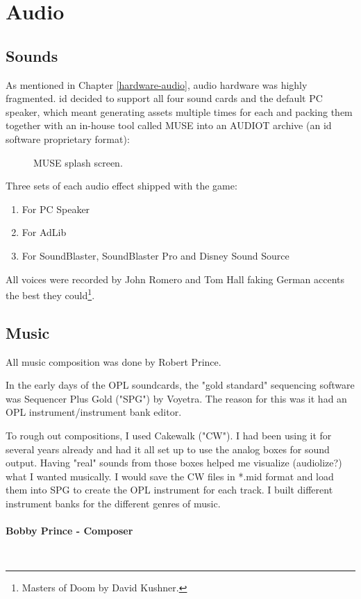 \documentclass[book.tex]{subfiles}
\begin{document}
\section{Audio}

\subsection{Sounds}
As mentioned in Chapter \ref{hardware-audio}, audio hardware was highly fragmented. id decided to support all four sound cards and the default PC speaker, which meant generating assets multiple times for each and packing them together with an in-house tool called MUSE into an AUDIOT archive (an id software proprietary format):\\
\begin{figure}[H]
\centering

  \caption{MUSE splash screen.}
 \end{figure}
 \par
 Three sets of each audio effect shipped with the game:
\begin{enumerate}
\item For PC Speaker
\item For AdLib
\item For SoundBlaster, SoundBlaster Pro and Disney Sound Source
\end{enumerate}

\par
All voices were recorded by John Romero and Tom Hall faking German accents the best they could\footnote{Masters of Doom by David Kushner.}.






\subsection{Music}
All music composition was done by Robert Prince.\\
\par
 \begin{fancyquotes}
In the early days of the OPL soundcards, the "gold standard" sequencing software was Sequencer Plus Gold ("SPG") by Voyetra. The reason for this was it had an OPL instrument/instrument bank editor.\\
\par
To rough out compositions, I used Cakewalk ("CW"). I had been using it for several years already and had it all set up to use the analog boxes for sound output. Having "real" sounds from those boxes helped me visualize (audiolize?) what I wanted musically. I would save the CW files in *.mid format and load them into SPG to create the OPL instrument for each track. I built different instrument banks for the different genres of music.\\
   \\
\textbf{Bobby Prince - Composer}
 \end{fancyquotes}\\
\end{document}
